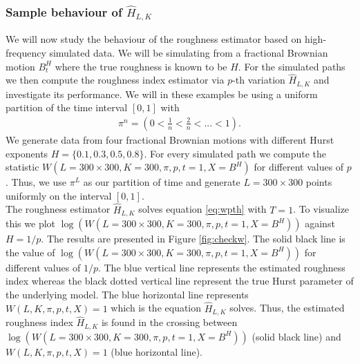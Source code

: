 \documentclass{article}
\begin{document}
\subsubsection{Sample behaviour of $\widehat{H}_{L,K}$}
We will now study the behaviour of the roughness estimator based on high-frequency simulated data. We will be simulating from a fractional Brownian motion $B_t^H$ where the true roughness is known to be $H$. For the simulated paths we then compute the roughness index estimator via $p$-th variation $\widehat{H}_{L,K}$ and investigate its performance. We will in these examples be using a uniform partition of the time interval $[0,1]$ with
\begin{align*}
\pi^n = \left( 0 < \frac{1}{n}< \frac{2}{n}<...< 1\right).
\end{align*}
We generate data from four fractional Brownian motions with different Hurst exponents $H=\{0.1,0.3,0.5,0.8\}$. For every simulated path we compute the statistic $W(L=300\times 300, K=300, \pi, p, t=1, X=B^H)$ for different values of $p$. Thus, we use $\pi^L$ as our partition of time and generate $L=300\times 300$ points uniformly on the interval $[0,1]$.\\
The roughness estimator $\widehat{H}_{L,K}$ solves equation \eqref{eq:wpth} with $T=1$. To visualize this we plot $\log(W(L=300\times 300, K=300, \pi, p, t=1, X=B^H))$ against $H=1/p$. The results are presented in Figure \ref{fig:checkw}. The solid black line is the value of $\log(W(L=300\times 300, K=300, \pi, p, t=1, X=B^H))$ for different values of $1/p$. The blue vertical line represents the estimated roughness index whereas the black dotted vertical line represent the true Hurst parameter of the underlying model. The blue horizontal line represents $W(L, K, \pi, p, t, X) = 1$ which is the equation $\widehat{H}_{L,K}$ solves. Thus, the estimated roughness index $\widehat{H}_{L,K}$ is found in the crossing between $\log(W(L=300\times 300, K=300, \pi, p, t=1, X=B^H))$ (solid black line) and $W(L, K, \pi, p, t, X) = 1$ (blue horizontal line).
\end{document}
